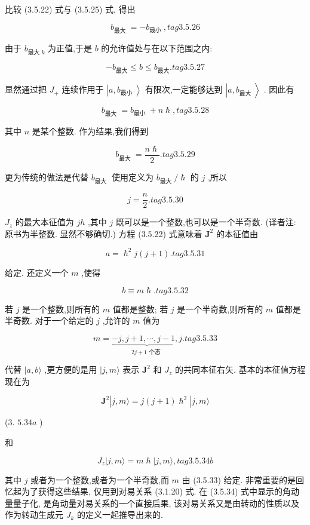 比较 (3.5.22) 式与 (3.5.25) 式, 得出

$$
{b}_{\text{最大 }} = - {b}_{\text{最小 }}, tag{3.5.26}
$$

由于 ${b}_{\text{最大 }k}$ 为正值,于是 $b$ 的允许值处与在以下范围之内:

$$
- {b}_{最大} \leq b \leq {b}_{最大}. tag{3. 5.27}
$$

显然通过把 ${J}_{ + }$ 连续作用于 $\left| {a,{b}_{\text{最小 }}}\right\rangle$ 有限次,一定能够达到 $\left| {a,{b}_{\text{最大 }}}\right\rangle$ . 因此有

$$
{b}_{\text{最大 }} = {b}_{\text{最小 }} + n\hslash , tag{3. 5.28}
$$

其中 $n$ 是某个整数. 作为结果,我们得到

$$
{b}_{\text{最大 }} = \frac{n\hslash }{2}. tag{3. 5.29}
$$

更为传统的做法是代替 ${b}_{\text{最大 }}$ 使用定义为 ${b}_{\text{最大 }}/\hslash$ 的 $j$ ,所以

$$
j = \frac{n}{2}. tag{3. 5.30}
$$

${J}_{z}$ 的最大本征值为 ${jh}$ ,其中 $j$ 既可以是一个整数,也可以是一个半奇数. (译者注: 原书为半整数. 显然不够确切.) 方程 (3.5.22) 式意味着 ${\mathbf{J}}^{2}$ 的本征值由

$$
a = {\hslash }^{2}j\left( {j + 1}\right) . tag{3. 5.31}
$$

给定. 还定义一个 $m$ ,使得

$$
b \equiv m\hslash . tag{3. 5.32}
$$

若 $j$ 是一个整数,则所有的 $m$ 值都是整数; 若 $j$ 是一个半奇数,则所有的 $m$ 值都是半奇数. 对于一个给定的 $j$ ,允许的 $m$ 值为

$$
m = \underset{{2j} + 1\text{ 个态 }}{\underbrace{-j, j + 1,\cdots, j - 1, j}}. tag{3. 5.33}
$$

代替 $|a, b\rangle$ ,更方便的是用 $|j, m\rangle$ 表示 ${\mathbf{J}}^{2}$ 和 ${J}_{z}$ 的共同本征右矢. 基本的本征值方程现在为

$$
{\mathbf{J}}^{2}\left| {j, m\rangle = j\left( {j + 1}\right) {\hslash }^{2}}\right| j, m\rangle
$$

(3. ${5.34a}$ )

和

$$
{J}_{z}\left| {j, m\rangle = m\hslash }\right| j, m\rangle , tag{3. 5.34b}
$$

其中 $j$ 或者为一个整数,或者为一个半奇数,而 $m$ 由 (3.5.33) 给定. 非常重要的是回忆起为了获得这些结果, 仅用到对易关系 (3.1.20) 式. 在 (3.5.34) 式中显示的角动量量子化, 是角动量对易关系的一个直接后果, 该对易关系又是由转动的性质以及作为转动生成元 ${J}_{k}$ 的定义一起推导出来的.


